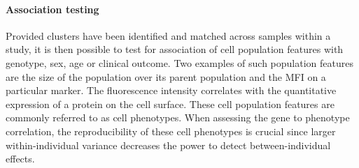 
%
%


\paragraph{Association testing}

Provided clusters have been identified and matched across samples within a study, it is then possible to test for association of cell population
features with genotype, sex, age or clinical outcome.
Two examples of such population features are the size of the population over its parent population and the \gls{MFI} on a particular marker.
The fluorescence intensity correlates with the quantitative expression of a protein on the cell surface.
These cell population features are commonly referred to as cell phenotypes.  
When assessing the gene to phenotype correlation, the reproducibility of these cell phenotypes is crucial since
larger within-individual variance decreases the power to detect between-individual effects.

